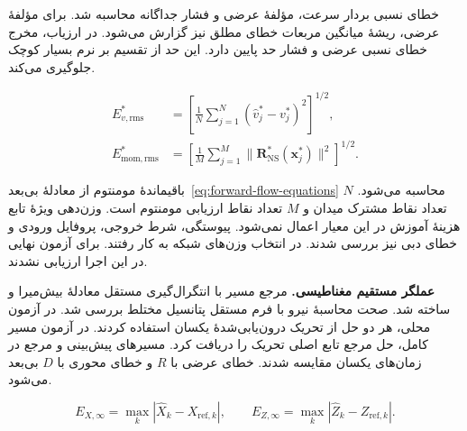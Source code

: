 خطای نسبی بردار سرعت، مؤلفهٔ عرضی و فشار جداگانه محاسبه شد.
برای مؤلفهٔ عرضی، ریشهٔ میانگین مربعات خطای مطلق نیز گزارش می‌شود.
در ارزیاب، مخرج خطای نسبی عرضی و فشار حد پایین دارد.
این حد از تقسیم بر نرم بسیار کوچک جلوگیری می‌کند.

\begin{equation}
\begin{aligned}
E_{v,\mathrm{rms}}^*
&=\left[\frac1N\sum_{j=1}^N(\widehat v_j^*-v_j^*)^2\right]^{1/2},\\
E_{\mathrm{mom,rms}}^*
&=\left[\frac1M\sum_{j=1}^M
 \|\mathbf R_{\mathrm{NS}}^*(\mathbf x_j^*)\|^2\right]^{1/2}.
\end{aligned}
\label{eq:validation-forward-flow-rms}
\end{equation}

باقیماندهٔ مومنتوم از معادلهٔ بی‌بعد~\eqref{eq:forward-flow-equations} محاسبه می‌شود.
$N$ تعداد نقاط مشترک میدان و $M$ تعداد نقاط ارزیابی مومنتوم است.
وزن‌دهی ویژهٔ تابع هزینهٔ آموزش در این معیار اعمال نمی‌شود.
پیوستگی، شرط خروجی، پروفایل ورودی و خطای دبی نیز بررسی شدند.
 در انتخاب وزن‌های شبکه به کار رفتند.
 برای آزمون نهایی در این اجرا ارزیابی نشدند.

\textbf{عملگر مستقیم مغناطیسی.}
مرجع مسیر با انتگرال‌گیری مستقل معادلهٔ بیش‌میرا و  ساخته شد.
صحت محاسبهٔ نیرو با فرم مستقل پتانسیل مختلط بررسی شد.
در آزمون محلی، هر دو حل از تحریک درون‌یابی‌شدهٔ یکسان استفاده کردند.
در آزمون مسیر کامل، حل مرجع تابع اصلی تحریک را دریافت کرد.
مسیرهای پیش‌بینی و مرجع در زمان‌های یکسان مقایسه شدند.
خطای عرضی با $R$ و خطای محوری با $D$ بی‌بعد می‌شود.

\begin{equation}
E_{X,\infty}=\max_k|\widehat X_k-X_{\mathrm{ref},k}|,
\qquad
E_{Z,\infty}=\max_k|\widehat Z_k-Z_{\mathrm{ref},k}|.
\label{eq:validation-forward-magnetic-errors}
\end{equation}

